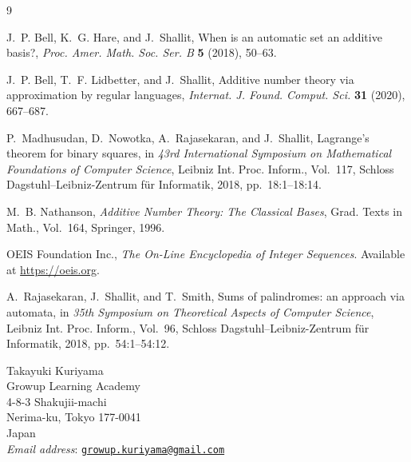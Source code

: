 \documentclass[12pt]{ltjsarticle}
\theoremstyle{plain}
\begin{document}
\begin{thebibliography}{9}

J.~P. Bell, K.~G. Hare, and J.~Shallit,
When is an automatic set an additive basis?,
\emph{Proc. Amer. Math. Soc. Ser. B} \textbf{5} (2018), 50--63.

J.~P. Bell, T.~F. Lidbetter, and J.~Shallit,
Additive number theory via approximation by regular languages,
\emph{Internat. J. Found. Comput. Sci.} \textbf{31} (2020), 667--687.

P.~Madhusudan, D.~Nowotka, A.~Rajasekaran, and J.~Shallit,
Lagrange's theorem for binary squares,
in \emph{43rd International Symposium on Mathematical Foundations of
Computer Science}, Leibniz Int. Proc. Inform., Vol.~117, Schloss
Dagstuhl--Leibniz-Zentrum f{\"u}r Informatik, 2018, pp.~18:1--18:14.

M.~B. Nathanson,
\emph{Additive Number Theory: The Classical Bases},
Grad. Texts in Math., Vol.~164, Springer, 1996.

OEIS Foundation Inc.,
\emph{The On-Line Encyclopedia of Integer Sequences}.
Available at \url{https://oeis.org}.

A.~Rajasekaran, J.~Shallit, and T.~Smith,
Sums of palindromes: an approach via automata,
in \emph{35th Symposium on Theoretical Aspects of Computer Science},
Leibniz Int. Proc. Inform., Vol.~96, Schloss Dagstuhl--Leibniz-Zentrum
f{\"u}r Informatik, 2018, pp.~54:1--54:12.

\end{thebibliography}

\begin{flushleft}
Takayuki Kuriyama\\
Growup Learning Academy\\
4-8-3 Shakujii-machi\\
Nerima-ku, Tokyo 177-0041\\
Japan\\
\textit{Email address}: \href{mailto:growup.kuriyama@gmail.com}
{\texttt{growup.kuriyama@gmail.com}}
\end{flushleft}
\end{document}
